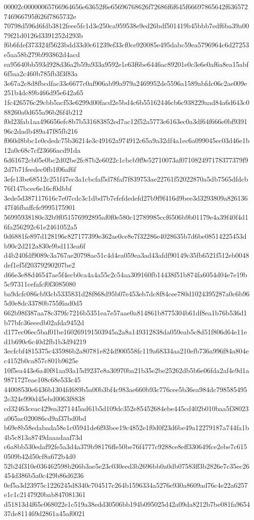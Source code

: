 {00002c00000065766964656e63652f6e65696768626f72686f6f645f66697865642f636572746966795f626f7865732e
70798d596d6fdb3812feee5fc1d3e250ca959538e9ed26bdf501419b45bbb7edf6ba39a0079f21d0126d3391252d293b
f6b6fdef373324f5623bdd33d0c61239ef33cf0ce920085e495dabc59ea5796964c6d27253e5aa58b279b993862d4acd
ea95640bb593d928d36a2b59a933a9592e1e63f6be6446ac89201e0c3e6e0af6a8ea15abf6f5aa2c460b785fb3f3f83a
3e67a2c8d8fbcdfac33e6677c0af906ab99a979a2469952de5596a1589abfdc06c2ae009e251b4dc89b466d95e642a65
1fc426576c29cbb5acf53e6299d00facd2e5bd4c6b55162446cb6c938229aad84a6d643c088260a0d655a96b26f4b212
f0d23fab1aa496656efc8b7b531683852ed7ac12f52a5773e6163ec0a3df64f666e0bf939196c2dadb489a47f85fb216
f060d8bbc1e0cdedc75b36214e3c49162a974912c65a9a32df4a1ec6a099045ec03d46e1b12a0c68c7cf23666acd91da
6d61672cb05e0bc2d02be2fc87b2e6022c1cbcb9f9e52710073af071082497178377379f92d7b71feedec0fb1f06af6f
3efe13be68512c251f47ec3a1cbcfaf5d78faf7f839753ae22761f52022870a5db7565dfdcb76f147bcec6e16cf0dbbf
3ede5d387117616c7e07cdc3c1dbd7b7efefdedefd27b9f9f416d9bee3d3293809a82613647f46fbaffcfe9995175901
56995938180c32b9f051576992895af0f0e580c12789985ccf6506b9b01179e4a39f40f4d16fa256292c61e2461052a5
0d6881fe897d128196c827177399e362ae0ce8e7f32286e4028635b7d6be08514225453db90c2d212a830e9bd113ea6f
d4b240fdf9089c3a767ae20798ae51c4d4ea059ea3ad43afdf90149c35fb6521f512eb0048def1ef5f20379290207be2
d66e3e88d46547ae5f4ecb0ca4a4a55c2c54aa309160fb14438f51b874fa6054d04e7e19b5c97311cefafcf0f3085080
ba9dcfc086cb93cb5335831d28f868d95b07e453eb7dc8f84cee780d1024395287a0c6b965d0e8dc33780b755f6ad0d5
662b98f387aa78c379fc7216b5351ea7e57aae0a814861b8775304b61df8ea1b76b536d1b77bfc36eeedb02afda9452d
d177ec06ec5baf01be160269191503945a2a8a149312838da059eab5c8d51f806d64e11ed1b690c6c40d2fb1b3d94219
3ecfcbf4815375c435986b2a80781e824d900558fc119a68334aa210efb736a996f84a804ec4152b0ca857c801b9625e
10f5ea443e6a40f81aa93a15d9237e8a30970ba21b35e2be25262db5b6e06fda2af4e9d1a9871727eae108c68e533c45
44008530e6436b1304fd689b5a00b3bf4c983ae660b93c776cee5b36ea984dc7985854952c324e990d45ebd0063f8838
cd32463ceac429ea3271445ad61b5d109dc352e85452684ebe445cd402b010baa5f38023a065ac020086cd9af37bd0bd
b69e8b58edabada58e1c05941de6f93bee19c4852e1f0d0f23d6be49a12279187a744fa1b4b5c813a8749daaadaaf73d
c6a8bb530edaf92fe5a3d4a379b98176ffe50be76f4777c9288ce8eff330649fce2ebe7c6150509b42d50cf8a672b4d0
52b24f310e036462598b266b3ae5e23c030eed3b2696bb0a0db07583ff3b2826e7c35ec26454d386b5a0c429b86d6236
0ef5a3d23975c1226245d8340c704517c264b1596334a5276e930a8609ad76c4e22a6257e1c1c2147920bab847081361
d51813d4f65c068022e1c519a38edd30506bb194b095025d42a09da8212b7be081fa965437de811469d2861a45af0021
}
